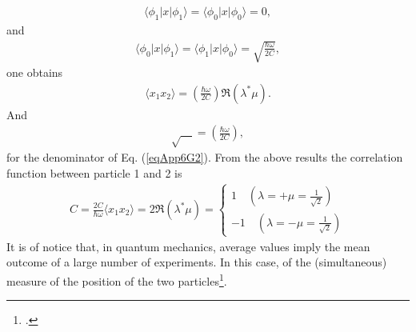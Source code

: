 \begin{subappendices}
\begin{align}\label{eqApp6G4}
\langle\phi_1|x|\phi_1\rangle=\langle\phi_0|x|\phi_0\rangle=0,
\end{align} 
and
\begin{align}\label{eqApp6G5}
\langle\phi_0|x|\phi_1\rangle=\langle\phi_1|x|\phi_0\rangle=\sqrt{\frac{\hbar\omega}{2C}},
\end{align}
one obtains
\begin{align}\label{eqApp6G6}
\langle x_1x_2\rangle=\left(\frac{\hbar\omega}{2C}\right)\Re(\lambda^*\mu).
\end{align} 
And 
\begin{align}\label{eqApp6G7}
\sqrt{\quad}=\left(\frac{\hbar\omega}{2C}\right),
\end{align}
for the denominator of Eq. (\ref{eqApp6G2}).
From the above results the correlation function between particle 1 and 2 is
\begin{align}\label{eqApp6G8}
C=\frac{2C}{\hbar\omega}\langle x_1x_2\rangle=2\Re(\lambda^*\mu)=
\left\{
\begin{array}{c}
 1\quad (\lambda=+\mu=\frac{1}{\sqrt{2}})\\ 
 -1 \quad (\lambda=-\mu=\frac{1}{\sqrt{2}})
\end{array}
\right. 
\end{align}
It is of notice that, in quantum mechanics, average values imply the mean outcome of a large number of experiments. In this case, of the (simultaneous) measure of the position of the two particles\footnote{\cite{Basdevant:05}.}.







\end{subappendices}
